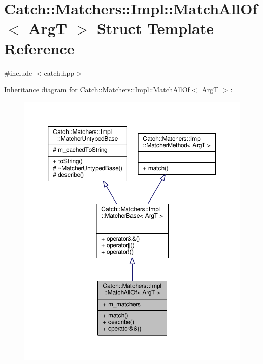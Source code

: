 \hypertarget{struct_catch_1_1_matchers_1_1_impl_1_1_match_all_of}{\section{Catch\-:\-:Matchers\-:\-:Impl\-:\-:Match\-All\-Of$<$ Arg\-T $>$ Struct Template Reference}
\label{struct_catch_1_1_matchers_1_1_impl_1_1_match_all_of}
}


{\ttfamily \#include $<$catch.\-hpp$>$}



Inheritance diagram for Catch\-:\-:Matchers\-:\-:Impl\-:\-:Match\-All\-Of$<$ Arg\-T $>$\-:
\nopagebreak
\begin{figure}[H]
\begin{center}
\leavevmode
\includegraphics[width=350pt]{struct_catch_1_1_matchers_1_1_impl_1_1_match_all_of__inherit__graph}
\end{center}
\end{figure}


